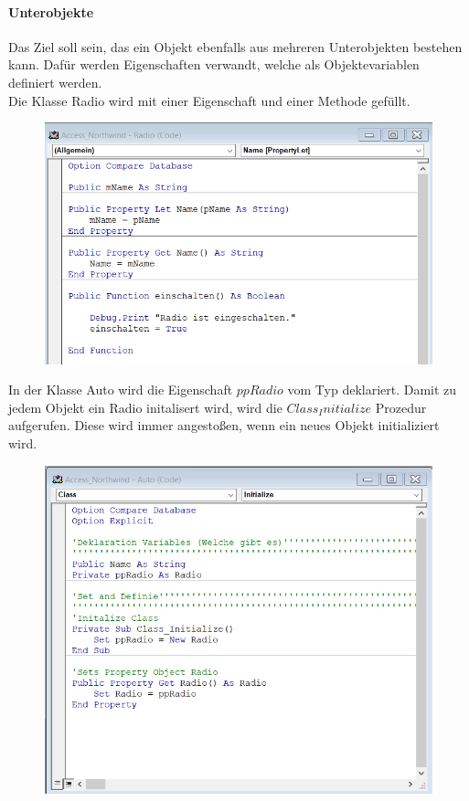 \paragraph{Unterobjekte}
Das Ziel soll sein, das ein Objekt ebenfalls aus mehreren Unterobjekten bestehen kann. Dafür werden Eigenschaften verwandt, welche als Objektevariablen definiert werden. \\

Die Klasse Radio wird mit einer Eigenschaft und einer Methode gefüllt.
\begin{figure}[H]
	\centering
	\includegraphics[scale = 0.3]{attachment/chapter_2/Scc038}
	\caption{}
	\label{fig:Scc038}
\end{figure} 
In der Klasse Auto wird die Eigenschaft $ppRadio$ vom Typ  deklariert. Damit zu jedem Objekt ein Radio initalisert wird, wird die $Class_Initialize$ Prozedur aufgerufen. Diese wird immer angestoßen, wenn ein neues Objekt initializiert wird.  
\begin{figure}[H]
	\centering
	\includegraphics[scale = 0.3]{attachment/chapter_2/Scc039}
	\caption{}
	\label{fig:Scc039}
\end{figure} 
